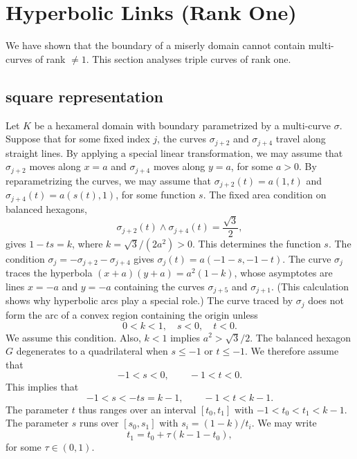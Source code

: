 \documentclass[11pt]{amsart}
\def\ta{{\tau}}
\begin{document}
\section{Hyperbolic Links (Rank One)}

We have shown that the boundary of a miserly domain cannot
contain multi-curves of rank $\ne 1$.  This section analyses triple
curves of rank one.


\subsection{square representation}

Let $K$ be a hexameral domain with boundary parametrized by a
multi-curve $\sigma$.  Suppose that for some fixed index $j$, the curves
$\sigma_{j+2}$ and $\sigma_{j+4}$ travel along straight lines.  By
applying a special linear transformation, we may assume that
$\sigma_{j+2}$ moves along $x=a$ and $\sigma_{j+4}$ moves along $y=a$,
for some $a>0$.  By reparametrizing the curves, we may assume that
$\sigma_{j+2}(t) = a(1,t)$ and $\sigma_{j+4}(t) = a(s(t),1)$, for some
function $s$.  The fixed area condition on balanced hexagons,
\begin{equation}
{\sigma_{j+2}(t)}\land{\sigma_{j+4}(t)}=\frac{\sqrt{3}}2,
\end{equation}
gives $1- t s = k$, where $k=\sqrt3/(2a^2) > 0$.  This determines the
function $s$.  The condition $\sigma_{j} = -\sigma_{j+2}
-\sigma_{j+4}$ gives $\sigma_{j}(t) = a (-1-s,-1-t)$.  The curve
$\sigma_{j}$ traces the hyperbola $(x+a)(y+a) = a^2(1-k)$, whose
asymptotes are lines $x=-a$ and $y=-a$ containing the curves
$\sigma_{j+5}$ and $\sigma_{j+1}$.  (This calculation shows why
hyperbolic arcs play a special role.)  The curve traced by
$\sigma_{j}$ does not form the arc of a convex region containing the
origin unless
   \begin{equation}
   0 < k < 1,\quad s<0,\quad t < 0.
   \end{equation}
   We assume this condition.  Also, $k<1$ implies $a^2 > \sqrt3/2$.
   The balanced hexagon $G$ degenerates to a quadrilateral when $s \le
   -1$ or $t\le -1$.  We therefore assume that
\begin{equation}
-1<s < 0,\qquad -1 < t < 0.
\end{equation}
  This implies that
\begin{equation}
-1 < s < -t s = k-1,\qquad -1 < t < k-1.
\end{equation}  
The parameter $t$ thus ranges
over an interval $[t_0,t_1]$ with $-1 < t_0 < t_1 < k-1$.  The parameter
$s$ runs over $[s_0,s_1]$ with $s_i = (1-k)/t_i$.  We may
write 
\begin{equation}
t_1 = t_0 + \ta (k-1-t_0),
\end{equation}
for some $\ta\in (0,1)$.
\end{document}
